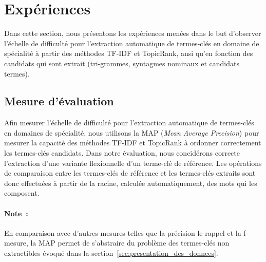 \section{Expériences}
\label{sec:experiences}
  Dans cette section, nous présentons les expériences menées dans le but
  d'observer l'échelle de difficulté pour l'extraction automatique de
  termes-clés en domaine de spécialité à partir des méthodes TF-IDF et
  TopicRank, ansi qu'en fonction des candidats qui sont extrait (tri-grammes,
  syntagmes nominaux et candidats termes).

  \subsection{Mesure d'évaluation}
  \label{subsec:mesure_d_evaluation}
    Afin mesurer l'échelle de difficulté pour l'extraction automatique de
    termes-clés en domaines de spécialité, nous utilisons la MAP (\textit{Mean
    Average Precision}) pour mesurer la capacité des méthodes TF-IDF et
    TopicRank à ordonner correctement les termes-clés candidats. Dans notre
    évaluation, nous concidérons correcte l'extraction d'une variante
    flexionnelle d'un terme-clé de référence. Les opérations de comparaison
    entre les termes-clés de référence et les termes-clés extraits sont donc
    effectuées à partir de la racine, calculée automatiquement, des mots qui les
    composent.

    \paragraph{Note~:}
    En comparaison avec d'autres mesures telles que la précision le rappel et la
    f-mesure, la MAP permet de s'abstraire du problème des termes-clés non
    extractibles évoqué dans la section~\ref{sec:presentation_des_donnees}.

